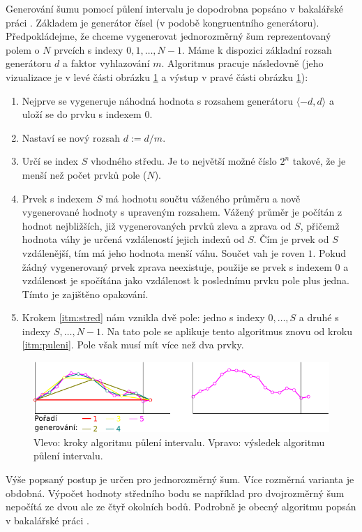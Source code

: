 Generování šumu pomocí půlení intervalu je dopodrobna popsáno v bakalářské práci \cite{MILET}.
Základem je generátor čísel (v podobě kongruentního generátoru).
Předpokládejme, že chceme vygenerovat jednorozměrný šum reprezentovaný polem o $N$ prvcích s indexy $0,1,\dotsc,N-1$.
Máme k dispozici základní rozsah generátoru $d$ a faktor vyhlazování $m$.
Algoritmus pracuje následovně (jeho vizualizace je v levé části obrázku \ref{fig:midpoint} a výstup v pravé části obrázku \ref{fig:midpoint}):
\begin{enumerate}
\item
Nejprve se vygeneruje náhodná hodnota s rozsahem generátoru $\langle -d,d \rangle$ a uloží se do prvku s indexem $0$.

\item \label{itm:puleni}
Nastaví se nový rozsah $d:=d/m$.

\item
Určí se index $S$ vhodného středu. Je to největší možné číslo $2^n$ takové, že je menší než počet prvků pole ($N$).

\item \label{itm:stred}
Prvek s indexem $S$ má hodnotu součtu váženého průměru a nově vygenerované hodnoty s upraveným rozsahem.
Vážený průměr je počítán z hodnot nejbližších, již vygenerovaných prvků zleva a zprava od $S$, přičemž hodnota váhy je určená vzdáleností jejich indexů od $S$.
Čím je prvek od $S$ vzdálenější, tím má jeho hodnota menší váhu.
Součet vah je roven $1$.
Pokud žádný vygenerovaný prvek zprava neexistuje, použije se prvek s indexem $0$ a vzdálenost je spočítána jako vzdálenost k poslednímu prvku pole plus jedna.
Tímto je zajištěno opakování.

\item
Krokem \ref{itm:stred} nám vznikla dvě pole: jedno s indexy $0,\dotsc,S$ a druhé s indexy $S,\dotsc,N-1$.
Na tato pole se aplikuje tento algoritmus znovu od kroku \ref{itm:puleni}.
Pole však musí mít více než dva prvky.
\end{enumerate}

\begin{figure}[h]
\centering
\includegraphics[width=15cm,keepaspectratio]{obr/midpoint.pdf}
\caption{Vlevo: kroky algoritmu půlení intervalu. Vpravo: výsledek algoritmu půlení intervalu.}
\label{fig:midpoint}
\end{figure}

Výše popsaný postup je určen pro jednorozměrný šum.
Více rozměrná varianta je obdobná.
Výpočet hodnoty středního bodu se například pro dvojrozměrný šum nepočítá ze dvou ale ze čtyř okolních bodů.
Podrobně je obecný algoritmu popsán v bakalářské práci \cite{MILET}.
